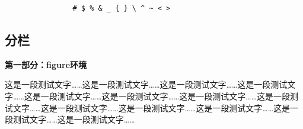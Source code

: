 \documentclass{ctexart}
\begin{document}
            \begin{verbatim}
                # $ % & _ { } \ ^ ~ < >
            \end{verbatim}
        

            \begin{verbatim*}
                # $ %
            \end{verbatim*}


        \setlength{\columnsep}{30pt}
    \twocolumn[\blindtext]
        \setlength{\columnseprule}{.4pt}
    \subsection{分栏}
            \textbf{第一部分：figure环境}

            这是一段测试文字……这是一段测试文字……这是一段测试文字……这是一段测试文字……这是一段测试文字……这是一段测试文字……这是一段测试文字……这是一段测试文字……这是一段测试文字……这是一段测试文字……这是一段测试文字……这是一段测试文字……这是一段测试文字……
\end{document}
